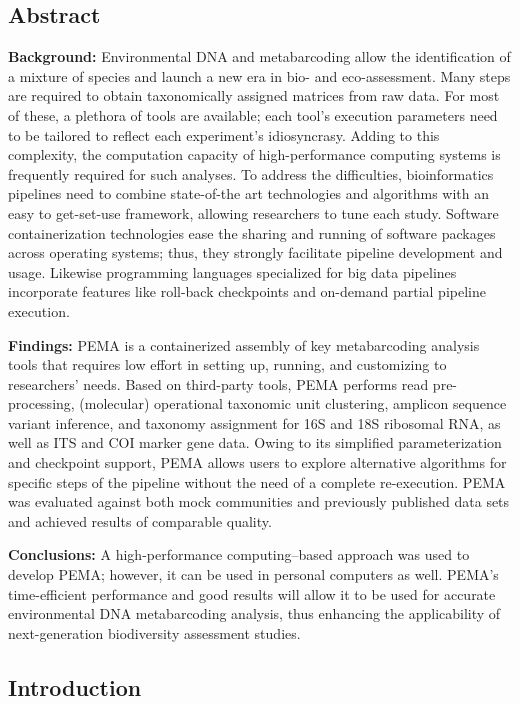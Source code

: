    \subsection{Abstract}
   \textbf{Background:} 
   Environmental DNA and metabarcoding allow the identification of a mixture of species and launch 
   a new era in bio- and eco-assessment. 
   Many steps are required to obtain taxonomically assigned matrices from raw data. For most of these, 
   a plethora of tools are available; each tool's execution parameters need to be tailored to reflect each experiment's idiosyncrasy. 
   Adding to this complexity, the computation capacity of high-performance computing systems is frequently required for such analyses. 
   To address the difficulties, bioinformatics pipelines need to combine state-of-the art technologies and 
   algorithms with an easy to get-set-use framework, allowing researchers to tune each study. 
   Software containerization technologies ease the sharing and running of software packages across operating systems; 
   thus, they strongly facilitate pipeline development and usage. 
   Likewise programming languages specialized for big data pipelines incorporate features like roll-back checkpoints and on-demand partial pipeline execution.

   \textbf{Findings:}
   PEMA is a containerized assembly of key metabarcoding analysis tools that requires low effort in setting up, running, and customizing to researchers' needs. 
   Based on third-party tools, PEMA performs read pre-processing, (molecular) operational taxonomic unit 
   clustering, amplicon sequence variant inference, and taxonomy assignment for 16S and 18S ribosomal RNA, as well as ITS and COI marker gene data. 
   Owing to its simplified parameterization and checkpoint support, PEMA allows users to explore alternative algorithms for specific steps of the pipeline without the need of a complete re-execution. 
   PEMA was evaluated against both mock communities and previously published data sets and achieved results of comparable quality.

   \textbf{Conclusions:}
   A high-performance computing–based approach was used to develop PEMA; however, it can be used in personal computers as well. 
   PEMA's time-efficient performance and good results will allow it to be used for accurate environmental DNA metabarcoding analysis, thus enhancing the applicability of next-generation biodiversity assessment studies.
   
   \subsection{Introduction}

